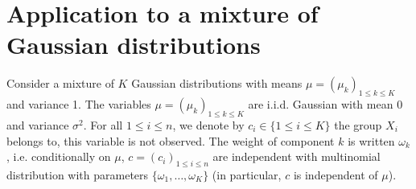 \documentclass[english,graybox,envcountchap,envcountsame,sectrefs,shortlabels]{svmono}
\theoremstyle{style}
\begin{document}
\section*{Application to a mixture of Gaussian distributions}
Consider a mixture of $K$ Gaussian distributions with means $\mu = (\mu_k)_{1\leqslant k \leqslant K}$ and variance 1. The variables  $\mu = (\mu_k)_{1\leqslant k \leqslant K}$ are  i.i.d. Gaussian with mean 0 and variance $\sigma^2$. For all $1\leq i\leq n$, we denote by $c_i\in\{1\leq i \leq K\}$ the group $X_i$ belongs to, this variable is not observed. The weight of component  $k$ is written $\omega_k$, i.e. conditionally on $\mu$, $c= (c_i)_{1\leq i\leq n}$ are independent with multinomial distribution with parameters $\{\omega_1,\ldots,\omega_K\}$ (in particular, $c$ is independent of $\mu$).  
\end{document}
